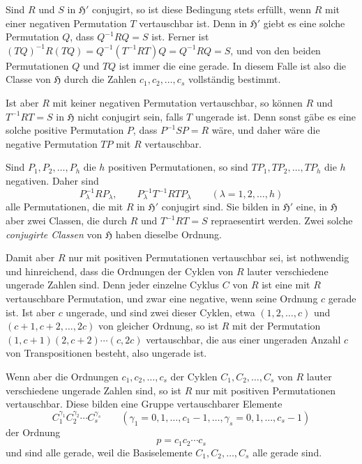 \documentclass[11pt]{article}
\newcommand{\Hgr}{\mathfrak{H}}
\begin{document}
Sind $R$ und $S$ in $\Hgr'$ conjugirt, so ist diese Bedingung stets erfüllt, wenn $R$ mit einer negativen Permutation $T$ vertauschbar ist. Denn in $\Hgr'$ giebt es eine solche Permutation $Q$, dass $Q^{-1}RQ=S$ ist. Ferner ist $(TQ)^{-1}R(TQ)=Q^{-1}(T^{-1}RT)Q=Q^{-1}RQ=S$, und von den beiden Permutationen $Q$ und $TQ$ ist immer die eine gerade. In diesem Falle ist also die Classe von $\Hgr$ durch die Zahlen $c_1,c_2,\ldots,c_s$ vollständig bestimmt.

Ist aber $R$ mit keiner negativen Permutation vertauschbar, so können $R$ und $T^{-1}RT=S$ in $\Hgr$ nicht conjugirt sein, falls $T$ ungerade ist. Denn sonst gäbe es eine solche positive Permutation $P$, dass $P^{-1}SP=R$ wäre, und daher wäre die negative Permutation $TP$ mit $R$ vertauschbar.

Sind $P_1,P_2,\ldots,P_h$ die $h$ positiven Permutationen, so sind $TP_1,TP_2,\ldots,TP_h$ die $h$ negativen. Daher sind
\[
 P_\lambda^{-1}RP_\lambda,\qquad P_\lambda^{-1}T^{-1}RTP_\lambda\qquad(\lambda=1,2,\ldots,h)
\]
alle Permutationen, die mit $R$ in $\Hgr'$ conjugirt sind. Sie bilden in $\Hgr'$ eine, in $\Hgr$ aber zwei Classen, die durch $R$ und $T^{-1}RT=S$ repraesentirt werden. Zwei solche \emph{conjugirte Classen} von $\Hgr$ haben dieselbe Ordnung.

Damit aber $R$ nur mit positiven Permutationen vertauschbar sei, ist nothwendig und hinreichend, dass die Ordnungen der Cyklen von $R$ lauter verschiedene ungerade Zahlen sind. Denn jeder einzelne Cyklus $C$ von $R$ ist eine mit $R$ vertauschbare Permutation, und zwar eine negative, wenn seine Ordnung $c$ gerade ist. Ist aber $c$ ungerade, und sind zwei dieser Cyklen, etwa $(1,2,\ldots,c)$ und $(c+1,c+2,\ldots,2c)$ von gleicher Ordnung, so ist $R$ mit der Permutation $(1,c+1)(2,c+2)\cdots(c,2c)$ vertauschbar, die aus einer ungeraden Anzahl $c$ von Transpositionen besteht, also ungerade ist.

Wenn aber die Ordnungen $c_1,c_2,\ldots,c_s$ der Cyklen $C_1,C_2,\ldots,C_s$ von $R$ lauter verschiedene ungerade Zahlen sind, so ist $R$ nur mit positiven Permutationen vertauschbar. Diese bilden eine Gruppe vertauschbarer Elemente
\begin{equation}\tag{1.}
 C_1^{\gamma_1}C_2^{\gamma_2}\cdots C_s^{\gamma_s}\qquad(\gamma_1=0,1,\ldots,c_1-1,\ldots,\gamma_s=0,1,\ldots,c_s-1)
\end{equation}
der Ordnung
\begin{equation}\tag{2.}
 p=c_1c_2\cdots c_s
\end{equation}
und sind alle gerade, weil die Basiselemente $C_1,C_2,\ldots,C_s$ alle gerade sind.
\end{document}
